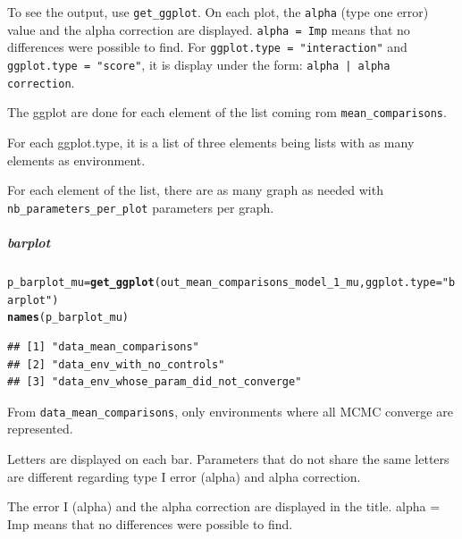 \documentclass{article}\usepackage[]{graphicx}\usepackage[]{color}
\makeatletter
\newcommand{\hlstr}[1]{\textcolor[rgb]{0.192,0.494,0.8}{#1}}%
\newcommand{\hlstd}[1]{\textcolor[rgb]{0.345,0.345,0.345}{#1}}%
\newcommand{\hlkwb}[1]{\textcolor[rgb]{0.69,0.353,0.396}{#1}}%
\newcommand{\hlkwc}[1]{\textcolor[rgb]{0.333,0.667,0.333}{#1}}%
\newcommand{\hlkwd}[1]{\textcolor[rgb]{0.737,0.353,0.396}{\textbf{#1}}}%
\newenvironment{kframe}{%
 \def\at@end@of@kframe{}%
 \ifinner\ifhmode%
  \def\at@end@of@kframe{\end{minipage}}%
  \begin{minipage}{\columnwidth}%
 \fi\fi%
 \def\FrameCommand##1{\hskip\@totalleftmargin \hskip-\fboxsep
 \colorbox{shadecolor}{##1}\hskip-\fboxsep
     \hskip-\linewidth \hskip-\@totalleftmargin \hskip\columnwidth}%
 \MakeFramed {\advance\hsize-\width
   \@totalleftmargin\z@ \linewidth\hsize
   \@setminipage}}%
 {\par\unskip\endMakeFramed%
 \at@end@of@kframe}
\newenvironment{knitrout}{}{} %
\makeatother
\begin{document}
To see the output, use \texttt{get\_ggplot}.
On each plot, the \texttt{alpha} (type one error) value and the alpha correction are displayed.
\texttt{alpha = Imp} means that no differences were possible to find.
For \texttt{ggplot.type = "interaction"} and \texttt{ggplot.type = "score"}, it is display under the form: \texttt{alpha | alpha correction}.

The ggplot are done for each element of the list coming rom \texttt{mean\_comparisons}.

For each ggplot.type, it is a list of three elements being lists with as many elements as environment. 

For each element of the list, there are as many graph as needed with \texttt{nb\_parameters\_per\_plot} parameters per graph.

\subparagraph{barplot}

\begin{knitrout}
\color{fgcolor}\begin{kframe}
\begin{alltt}
\hlstd{p_barplot_mu} \hlkwb{=} \hlkwd{get_ggplot}\hlstd{(out_mean_comparisons_model_1_mu,} \hlkwc{ggplot.type} \hlstd{=} \hlstr{"barplot"}\hlstd{)}
\hlkwd{names}\hlstd{(p_barplot_mu)}
\end{alltt}
\begin{verbatim}
## [1] "data_mean_comparisons"                
## [2] "data_env_with_no_controls"            
## [3] "data_env_whose_param_did_not_converge"
\end{verbatim}
\end{kframe}
\end{knitrout}

From \texttt{data\_mean\_comparisons}, only environments where all MCMC converge are represented.

Letters are displayed on each bar. Parameters that do not share the same letters are different regarding type I error (alpha) and alpha correction. 

The error I (alpha) and the alpha correction are displayed in the title. 
alpha = Imp means that no differences were possible to find.
\end{document}
